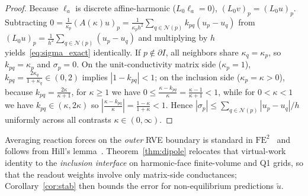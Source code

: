 \documentclass[preprint,11pt]{elsarticle}
\newcommand{\abs}[1]{\left\lvert #1 \right\rvert}
\begin{document}
\begin{proof}
Because $\ell_a$ is discrete affine-harmonic ($L_0 \ell_a = 0$), $(L_0 v)_p = (L_0 u)_p$. Subtracting $0 = \frac{1}{\kappa_p}(A(\kappa)u)_p = \frac{1}{\kappa_p h^2}\sum_{q\in\mathcal{N}(p)} k_{pq}(u_p - u_q)$ from $(L_0 u)_p = \frac{1}{h^2}\sum_{q\in\mathcal{N}(p)} (u_p - u_q)$ and multiplying by $h$ yields~\eqref{eq:sigma_exact} identically. If $p \notin \partial I$, all neighbors share $\kappa_q = \kappa_p$, so $k_{pq} = \kappa_p$ and $\sigma_p = 0$. On the unit-conductivity matrix side ($\kappa_p = 1$), $k_{pq} = \frac{2\kappa_q}{1+\kappa_q} \in (0, 2)$ implies $\abs{1 - k_{pq}} < 1$; on the inclusion side ($\kappa_p = \kappa > 0$), because $k_{pq} = \frac{2\kappa}{\kappa+1}$, for $\kappa \ge 1$ we have $0 \le \frac{\kappa - k_{pq}}{\kappa} = \frac{\kappa - 1}{\kappa + 1} < 1$, while for $0 < \kappa < 1$ we have $k_{pq} \in (\kappa, 2\kappa)$ so $\abs{\frac{\kappa - k_{pq}}{\kappa}} = \frac{1-\kappa}{1+\kappa} < 1$. Hence $\abs{\sigma_p} \le \sum_{q\in\mathcal{N}(p)} \abs{u_p - u_q}/h$ uniformly across all contrasts $\kappa \in (0, \infty)$.
\end{proof}

Averaging reaction forces on the \emph{outer} RVE boundary is standard in $\mathrm{FE}^2$~\cite{miehe2002strain,kouznetsova2001approach,geers2010multiscale} and follows from Hill's lemma~\cite{nemat1999micromechanics,milton2002theory}. Theorem~\ref{thm:dipole} relocates that virtual-work identity to the \emph{inclusion interface} on harmonic-face finite-volume and Q1 grids, so that the readout weights involve only matrix-side conductances; Corollary~\ref{cor:stab} then bounds the error for non-equilibrium predictions $\tilde u$.
\end{document}
